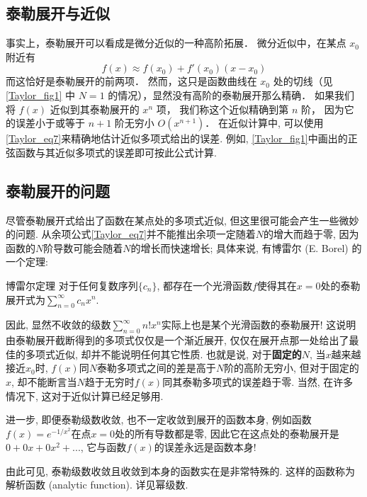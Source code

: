 \subsection{泰勒展开与近似}
事实上，泰勒展开可以看成是微分近似的一种高阶拓展． 微分近似中，在某点 $x_0$ 附近有
\begin{equation}
f(x) \approx f(x_0) + f'(x_0)(x - x_0)
\end{equation}
而这恰好是泰勒展开的前两项． 然而，这只是函数曲线在 $x_0$ 处的切线（见\autoref{Taylor_fig1} 中 $N=1$ 的情况），显然没有高阶的泰勒展开那么精确． 如果我们将 $f(x)$ 近似到其泰勒展开的 $x^n$ 项， 我们称这个近似精确到第 $n$ 阶， 因为它的误差小于或等于 $n + 1$ 阶无穷小 $O(x^{n + 1})$． 在近似计算中, 可以使用\autoref{Taylor_eq7}来精确地估计近似多项式给出的误差. 例如, \autoref{Taylor_fig1}中画出的正弦函数与其近似多项式的误差即可按此公式计算.

\subsection{泰勒展开的问题}
尽管泰勒展开式给出了函数在某点处的多项式近似, 但这里很可能会产生一些微妙的问题. 从余项公式\autoref{Taylor_eq7}并不能推出余项一定随着$N$的增大而趋于零, 因为函数的$N$阶导数可能会随着$N$的增长而快速增长; 具体来说, 有博雷尔 (E. Borel) 的一个定理:
\begin{theorem}{博雷尔定理}
对于任何复数序列$\{c_n\}$, 都存在一个光滑函数$f$使得其在$x=0$处的泰勒展开式为$\sum_{n=0}^\infty c_nx^n$.
\end{theorem}
因此, 显然不收敛的级数$\sum_{n=0}^\infty n!x^n$实际上也是某个光滑函数的泰勒展开! 这说明由泰勒展开截断得到的多项式仅仅是一个渐近展开, 仅仅在展开点那一处给出了最佳的多项式近似, 却并不能说明任何其它性质. 也就是说, 对于\textbf{固定的$N$}, 当$x$越来越接近$x_0$时, $f(x)$同$N$泰勒多项式之间的差是高于$N$阶的高阶无穷小, 但对于固定的$x$, 却不能断言当$N$趋于无穷时$f(x)$同其泰勒多项式的误差趋于零. 当然, 在许多情况下, 这对于近似计算已经足够用.

进一步, 即便泰勒级数收敛, 也不一定收敛到展开的函数本身, 例如函数$f(x)=e^{-1/x^2}$在点$x=0$处的所有导数都是零, 因此它在这点处的泰勒展开是$0+0x+0x^2+...$, 它与函数$f(x)$的误差永远是函数本身!

由此可见, 泰勒级数收敛且收敛到本身的函数实在是非常特殊的. 这样的函数称为解析函数 (analytic function). 详见幂级数.